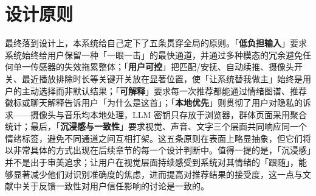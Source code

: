 \section{设计原则}

最终落到设计上，本系统给自己定下了五条贯穿全局的原则。「\textbf{低负担输入}」要求系统始终给用户保留一种「一眼一击」的最快通道，并通过多种模态的冗余避免任何单一传感器的失效拖累整体；「\textbf{用户可控}」把匹配/安抚、自动续推、摄像头开关、最近播放排除时长等关键开关放在显著位置，使「让系统替我做主」始终是用户的主动选择而非默认结果；「\textbf{可解释}」要求每一次推荐都能通过情绪图谱、推荐徽标或聊天解释告诉用户「为什么是这首」；「\textbf{本地优先}」则贯彻了用户对隐私的诉求——摄像头与音乐均本地处理，LLM 密钥只存放于浏览器，群体页面采用聚合统计；最后，「\textbf{沉浸感与一致性}」要求视觉、声音、文字三个层面共同响应同一个情绪标签，避免不同通道之间互相打架。这五条原则在表面上略显抽象，但它们将以非常具体的方式出现在后续章节的每一个设计判断中。值得一提的是，「沉浸感」并不是出于审美追求；让用户在视觉层面持续感受到系统对其情绪的「跟随」，能够显著减少他们对识别准确度的焦虑，进而提高对推荐结果的接受度，这一点与文献中关于反馈一致性对用户信任影响的讨论是一致的\cite{shneiderman2016designing}。
